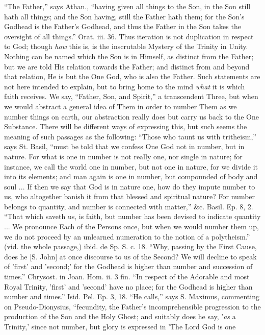 ``The Father,'' says Athan., ``having given all
things to the Son, in the Son still hath all things; and the Son
having, still the Father hath them; for the Son's Godhead is the
Father's Godhead, and thus the Father in the Son takes the oversight
of all things.'' Orat. iii. 36. Thus iteration is not duplication in
respect to God; though \emph{how} this is, is the inscrutable Mystery
of the Trinity in Unity. Nothing can be named which the Son is in
Himself, as distinct from the Father; but we are told His relation
towards the Father; and distinct from and beyond that relation, He is
but the One God, who is also the Father. Such statements are not here
intended to explain, but to bring home to the mind \emph{what} it is
which faith receives. We say, ``Father, Son, and Spirit,'' a
transcendent Three, but when we would abstract a general idea of Them
in order to number Them as we number things on earth, our abstraction
really does but carry us back to the One Substance. There will be
different ways of expressing this, but such seems the meaning of such
passages as the following: ``Those who taunt us with tritheism,'' says
St. Basil, ``must be told that we confess One God not in number, but in
nature. For what is one in number is not really one, nor single in
nature; for instance, we call the world one in number, but not one in
nature, for we divide it into its elements; and man again is one in
number, but compounded of body and soul ... If then we say that God is
in nature one, how do they impute number to us, who altogether banish
it from that blessed and spiritual nature? For number belongs to
quantity, and number is connected with matter,'' \&c. Basil. Ep. 8,
2. ``That which saveth us, is faith, but number has been devised to
indicate quantity ... We pronounce Each of the Persons once, but when
we would number them up, we do not proceed by an unlearned numeration
to the notion of a polytheism.'' (vid. the whole passage,) ibid. de Sp.
S. c. 18. ``Why, passing by the First Cause, does he [S. John] at once
discourse to us of the Second? We will decline to speak of 'first' and
'second;' for the Godhead is higher than number and succession of
times.'' Chrysost. in Joan. Hom. ii. 3 fin. ``In respect of the Adorable
and most Royal Trinity, 'first' and 'second' have no place; for the
Godhead is higher than number and times.'' Isid. Pel. Ep. 3, 18. ``He
calls,'' says S. Maximus, commenting on Pseudo-Dionysius, ``fecundity,
the Father's incomprehensible progression to the production of the Son
and the Holy Ghost; and suitably does he say, '\emph{as} a Trinity,'
since not number, but glory is expressed in 'The Lord God is one
